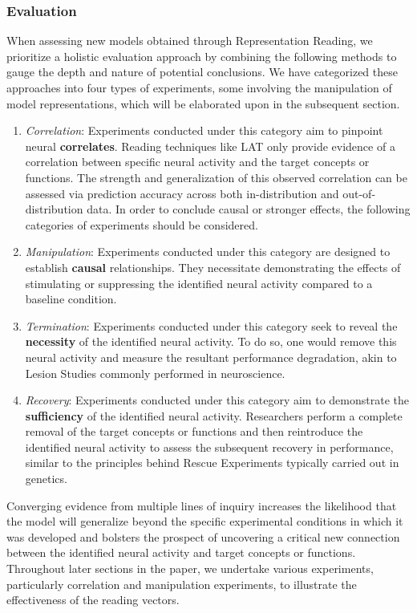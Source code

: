 \subsubsection{Evaluation} \label{subsec:rep-eval}
When assessing new models obtained through Representation Reading, we prioritize a holistic evaluation approach by combining the following methods to gauge the depth and nature of potential conclusions. We have categorized these approaches into four types of experiments, some involving the manipulation of model representations, which will be elaborated upon in the subsequent section.
\begin{enumerate}[leftmargin=*]%
    \item \emph{Correlation}: Experiments conducted under this category aim to pinpoint neural \textbf{correlates}. Reading techniques like LAT only provide evidence of a correlation between specific neural activity and the target concepts or functions. The strength and generalization of this observed correlation can be assessed via prediction accuracy across both in-distribution and out-of-distribution data. In order to conclude causal or stronger effects, the following categories of experiments should be considered.
    \item \emph{Manipulation}: Experiments conducted under this category are designed to establish \textbf{causal} relationships. They necessitate demonstrating the effects of stimulating or suppressing the identified neural activity compared to a baseline condition.
    \item \emph{Termination}: Experiments conducted under this category seek to reveal the \textbf{necessity} of the identified neural activity. To do so, one would remove this neural activity and measure the resultant performance degradation, akin to Lesion Studies commonly performed in neuroscience.
    \item \emph{Recovery}: Experiments conducted under this category aim to demonstrate the \textbf{sufficiency} of the identified neural activity. Researchers perform a complete removal of the target concepts or functions and then reintroduce the identified neural activity to assess the subsequent recovery in performance, similar to the principles behind Rescue Experiments typically carried out in genetics.
\end{enumerate}
Converging evidence from multiple lines of inquiry increases the likelihood that the model will generalize beyond the specific experimental conditions in which it was developed and bolsters the prospect of uncovering a critical new connection between the identified neural activity and target concepts or functions. Throughout later sections in the paper, we undertake various experiments, particularly correlation and manipulation experiments, to illustrate the effectiveness of the reading vectors.







